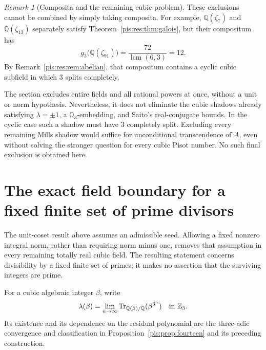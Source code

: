 \documentclass[11pt,a4paper]{article}
\theoremstyle{definition}\newtheorem{definition}[theorem]{Definition}
\theoremstyle{remark}\newtheorem{remark}[theorem]{Remark}
\newcommand{\Q}{\mathbb Q}\newcommand{\R}{\mathbb R}
\newcommand{\Tr}{\operatorname{Tr}}\newcommand{\Nm}{\operatorname{N}}
\begin{document}
\begin{remark}[Composita and the remaining cubic problem]
\label{pis:res:rem:limits}
These exclusions cannot be combined by simply taking composita.
For example, $\Q(\zeta_7)$ and $\Q(\zeta_{13})$ separately satisfy
Theorem~\ref{pis:res:thm:galois}, but their compositum has
\[
 g_3\bigl(\Q(\zeta_{91})\bigr)
 =\frac{72}{\operatorname{lcm}(6,3)}=12.
\]
By Remark~\ref{pis:res:rem:abelian}, that compositum contains a cyclic
cubic subfield in which $3$ splits completely.

The section excludes entire fields and all rational powers at once,
without a unit or norm hypothesis. Nevertheless, it does not eliminate
the cubic shadows already satisfying $\lambda=\pm1$, a
$\Q_3$-embedding, and Saito's real-conjugate bounds. In the cyclic
case such a shadow must have $3$ completely split. Excluding every
remaining Mills shadow would suffice for unconditional transcendence
of $A$, even without solving the stronger question for every cubic
Pisot number. No such final exclusion is obtained here.
\end{remark}


\section{The exact field boundary for a fixed finite set of prime divisors}
\label{pis:res:sec:barrier}

The unit-coset result above assumes an admissible seed. Allowing a
fixed nonzero integral norm, rather than requiring norm minus one,
removes that assumption in every remaining totally real cubic field.
The resulting statement concerns divisibility by a fixed finite set
of primes; it makes no assertion that the surviving integers are prime.

For a cubic algebraic integer $\beta$, write
\[
 \lambda(\beta)=\lim_{n\to\infty}
       \Tr_{\Q(\beta)/\Q}(\beta^{3^n})\quad\hbox{in }\Z_3.
\]
Its existence and its dependence on the residual polynomial are the
three-adic convergence and classification in
Proposition~\ref{pis:prop:fourteen} and its preceding construction.
\end{document}
